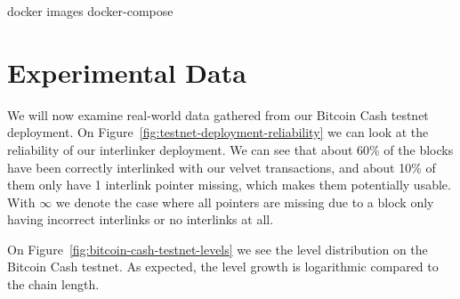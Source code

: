 docker images
docker-compose

\section{Experimental Data}

We will now examine real-world data gathered from our Bitcoin Cash testnet deployment. On Figure~\ref{fig:testnet-deployment-reliability} we can look at the reliability of our interlinker deployment. We can see that about 60\% of the blocks have been correctly interlinked with our velvet transactions, and about 10\% of them only have 1 interlink pointer missing, which makes them potentially usable. With $\infty$ we denote the case where all pointers are missing due to a block only having incorrect interlinks or no interlinks at all.


On Figure~\ref{fig:bitcoin-cash-testnet-levels} we see the level distribution on the Bitcoin Cash testnet. As expected, the level growth is logarithmic compared to the chain length.
